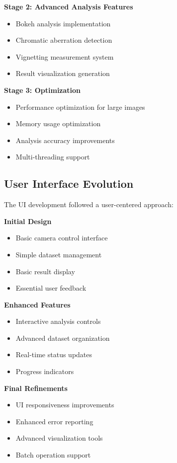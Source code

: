 \textbf{Stage 2: Advanced Analysis Features}
\begin{itemize}
    \item Bokeh analysis implementation
    \item Chromatic aberration detection
    \item Vignetting measurement system
    \item Result visualization generation
\end{itemize}

\textbf{Stage 3: Optimization}
\begin{itemize}
    \item Performance optimization for large images
    \item Memory usage optimization
    \item Analysis accuracy improvements
    \item Multi-threading support
\end{itemize}

\subsection{User Interface Evolution}
The UI development followed a user-centered approach:

\textbf{Initial Design}
\begin{itemize}
    \item Basic camera control interface
    \item Simple dataset management
    \item Basic result display
    \item Essential user feedback
\end{itemize}

\textbf{Enhanced Features}
\begin{itemize}
    \item Interactive analysis controls
    \item Advanced dataset organization
    \item Real-time status updates
    \item Progress indicators
\end{itemize}

\textbf{Final Refinements}
\begin{itemize}
    \item UI responsiveness improvements
    \item Enhanced error reporting
    \item Advanced visualization tools
    \item Batch operation support
\end{itemize}

